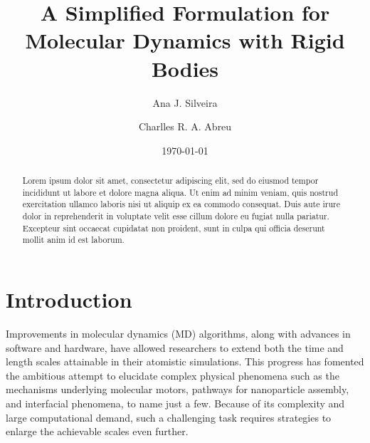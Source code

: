 \documentclass[aip,jcp,reprint,amsmath,amssymb,raggedbottom]{revtex4-1}
\begin{document}
\title{A Simplified Formulation for Molecular Dynamics with Rigid Bodies}

\author{Ana J. Silveira}

\author{Charlles R. A. Abreu}

\date{\today}

\begin{abstract}
Lorem ipsum dolor sit amet, consectetur adipiscing elit, sed do eiusmod tempor incididunt ut labore et dolore magna aliqua. Ut enim ad minim veniam, quis nostrud exercitation ullamco laboris nisi ut aliquip ex ea commodo consequat. Duis aute irure dolor in reprehenderit in voluptate velit esse cillum dolore eu fugiat nulla pariatur. Excepteur sint occaecat cupidatat non proident, sunt in culpa qui officia deserunt mollit anim id est laborum.
\end{abstract}

\maketitle

\section{Introduction}

Improvements in molecular dynamics (MD) algorithms, along with advances in software and hardware, have allowed researchers to extend both the time and length scales attainable in their atomistic simulations. This progress has fomented the ambitious attempt to elucidate complex physical phenomena such as the mechanisms underlying molecular motors, pathways for nanoparticle assembly, and interfacial phenomena, to name just a few. Because of its complexity and large computational demand, such a challenging task requires strategies to enlarge the achievable scales even further.
\end{document}
